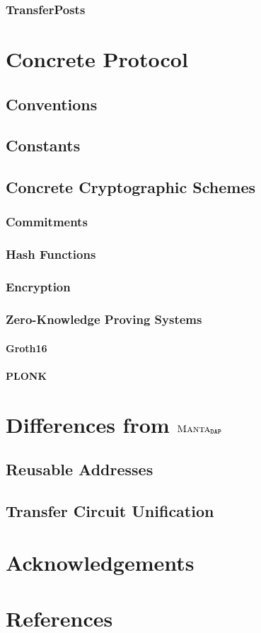 \documentclass[a4paper]{article}
\newcommand{\subsubsubsection}[1]{\paragraph{#1}}
\newcommand{\lsection}[2]{\def\sectionlabel{#2} \section{#1}\label{sec:#2}}
\newcommand{\MantaDAP}{{\Manta{}_{\texttt{DAP}}}}
\newcommand{\Manta}{{\textsc{Manta}}}
\newcommand{\TransferPost}{{\textsf{TransferPost}}}
\newcommand{\Transfer}{{\textsf{Transfer}}}
\begin{document}
\subsubsection{\TransferPost{s}}

\lsection{Concrete Protocol}{concrete-protocol}

\subsection{Conventions}

\subsection{Constants}

\subsection{Concrete Cryptographic Schemes}

\subsubsection{Commitments}

\subsubsection{Hash Functions}

\subsubsection{Encryption}

\subsubsection{Zero-Knowledge Proving Systems}

\subsubsubsection{Groth16}

\subsubsubsection{PLONK}

\lsection{Differences from $\MantaDAP$}{differences}

\subsection{Reusable Addresses}

\subsection{\Transfer{} Circuit Unification}

\lsection{Acknowledgements}{acknowledgements}

\lsection{References}{references}
\end{document}
